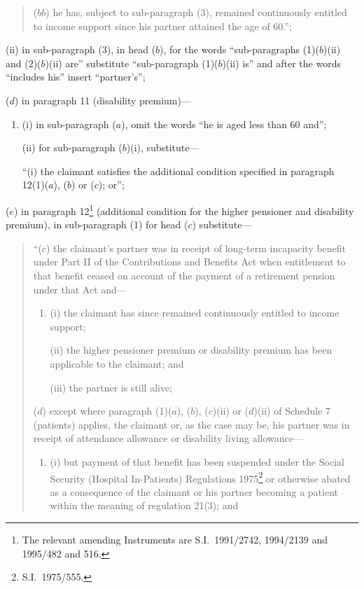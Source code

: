 \documentclass[12pt,a4paper]{article}
\begin{document}
\begin{enumerate}
\begin{enumerate}
\begin{quotation}
\begin{enumerate}
\begin{enumerate}
\begin{itemize}
($bb$) he has, subject to sub-paragraph (3), remained continuously entitled to income support since his partner attained the age of 60.”;
\end{itemize}
\end{enumerate}
\end{enumerate}
\end{quotation}

(ii) in sub-paragraph (3), in head ($b$), for the words “sub-paragraphs (1)($b$)(ii)  and (2)($b$)(ii)  are” substitute “sub-paragraph (1)($b$)(ii)  is” and after the words “includes his” insert “partner's”;
\end{enumerate}

($d$) in paragraph 11 (disability premium)—
\begin{enumerate}\item[]
(i) in sub-paragraph ($a$), omit the words “he is aged less than 60 and”;

(ii) for sub-paragraph ($b$)(i), substitute—

“(i) the claimant satisfies the additional condition specified in paragraph 12(1)($a$), ($b$)  or ($c$); or”;
\end{enumerate}

($e$) in paragraph 12\footnote{The relevant amending Instruments are S.I.\ 1991/2742, 1994/2139 and 1995/482 and 516.} (additional condition for the higher pensioner and disability premium), in sub-paragraph (1) for head ($c$)  substitute—
\begin{quotation}
“($c$) the claimant’s partner was in receipt of long-term incapacity benefit under Part II of the Contributions and Benefits Act when entitlement to that benefit ceased on account of the payment of a retirement pension under that Act and—
\begin{enumerate}\item[]
(i) the claimant has since remained continuously entitled to income support;

(ii) the higher pensioner premium or disability premium has been applicable to the claimant; and

(iii) the partner is still alive;
\end{enumerate}

($d$) except where paragraph (1)($a$), ($b$), ($c$)(ii)  or ($d$)(ii)  of Schedule 7 (patients) applies, the claimant or, as the case may be, his partner was in receipt of attendance allowance or disability living allowance—
\begin{enumerate}\item[]
(i) but payment of that benefit has been suspended under the Social Security (Hospital In-Patients) Regulations 1975\footnote{S.I.\ 1975/555.} or otherwise abated as a consequence of the claimant or his partner becoming a patient within the meaning of regulation 21(3); and


\end{enumerate}
\end{quotation}
\end{enumerate}
\end{document}
